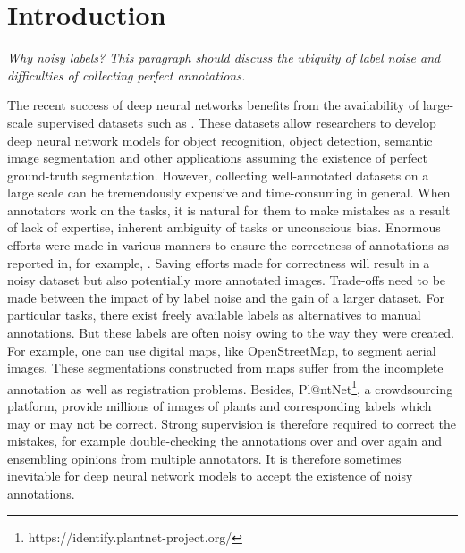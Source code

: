 \section{Introduction}
\label{introduction}


\noindent
\textit{Why noisy labels?
This paragraph should discuss the ubiquity of label noise and difficulties of collecting perfect annotations.}

\noindent
The recent success of deep neural networks benefits from the availability of large-scale supervised datasets such as \cite{russakovsky2015imagenet,everingham2015pascal,mottaghi2014role,lin2014microsoft}.
These datasets allow researchers to develop deep neural network models for object recognition\cite{simonyan2014very}, object detection\cite{girshick2014rich}, semantic image segmentation\cite{long2015fully,zheng2015conditional} and other applications assuming the existence of perfect ground-truth segmentation.
However, collecting well-annotated datasets on a large scale can be tremendously expensive and time-consuming in general.
When annotators work on the tasks, it is natural for them to make mistakes as a result of lack of expertise, inherent ambiguity of tasks or unconscious bias.
Enormous efforts were made in various manners to ensure the correctness of annotations as reported in, for example, \cite{russakovsky2015imagenet,lin2014microsoft}.
Saving efforts made for correctness will result in a noisy dataset but also potentially more annotated images.
Trade-offs need to be made between the impact of by label noise and the gain of a larger dataset.
For particular tasks, there exist freely available labels as alternatives to manual annotations.
But these labels are often noisy owing to the way they were created.
For example, one can use digital maps, like OpenStreetMap, to segment aerial images.
These segmentations constructed from maps suffer from the incomplete annotation as well as registration problems.\cite{mnih2012learning}
Besides, Pl@ntNet\footnote{https://identify.plantnet-project.org/}, a crowdsourcing platform, provide millions of images of plants and corresponding labels which may or may not be correct.
Strong supervision is therefore required to correct the mistakes, for example double-checking the annotations over and over again and ensembling opinions from multiple annotators.
It is therefore sometimes inevitable for deep neural network models to accept the existence of noisy annotations.

